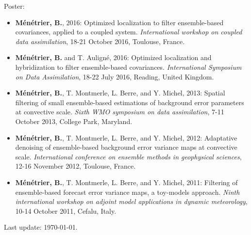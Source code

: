 \documentclass[a4paper,9pt]{scrreprt}
\begin{document}
$  $\\
Poster:\vspace{0.2cm}
\begin{itemize}
\item \textbf{Ménétrier, B.}, 2016: Optimized localization to filter ensemble-based covariances, applied to a coupled system. \textit{International workshop on coupled data assimilation}, 18-21 October 2016, Toulouse, France.\vspace{-0.1cm}
\item \textbf{Ménétrier, B.} and T. Auligné, 2016: Optimized localization and hybridization to filter ensemble-based covariances. \textit{International Symposium on Data Assimilation}, 18-22 July 2016, Reading, United Kingdom.\vspace{-0.1cm}
\item \textbf{Ménétrier, B.}, T. Montmerle, L. Berre, and Y. Michel, 2013: Spatial filtering of small ensemble-based estimations of background error parameters at convective scale. \textit{Sixth WMO symposium on data assimilation}, 7-11 October 2013, College Park, Maryland.\vspace{-0.1cm}
\item \textbf{Ménétrier, B.}, T. Montmerle, L. Berre, and Y. Michel, 2012: Adaptative denoising of ensemble-based background error variance maps at convective scale. \textit{International conference on ensemble methods in geophysical sciences}, 12-16 November 2012, Toulouse, France.\vspace{-0.1cm}
\item \textbf{Ménétrier, B.}, T. Montmerle, L. Berre, and Y. Michel, 2011: Filtering of ensemble-based forecast error variance maps, a toy-models approach. \textit{Ninth international workshop on adjoint model applications in dynamic meteorology}, 10-14 October 2011, Cefalu, Italy.
\end{itemize}
$  $\\
Last update: \today.
\end{document}
